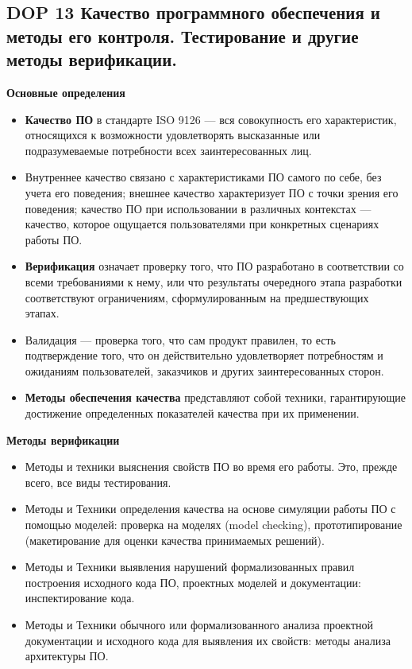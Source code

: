\subsection{DOP 13 Качество программного обеспечения и методы его контроля. Тестирование и другие методы верификации.}

\textbf{Основные определения}
\begin{itemize}
    \item \textbf{Качество ПО} в стандарте ISO 9126 --- вся совокупность его характеристик, относящихся к возможности удовлетворять высказанные или подразумеваемые потребности всех заинтересованных лиц.
    \item Внутреннее качество связано с характеристиками ПО самого по себе, без учета его поведения; внешнее качество характеризует ПО с точки зрения его поведения; качество ПО при использовании в различных контекстах --- качество, которое ощущается пользователями при конкретных сценариях работы ПО.
    \item \textbf{Верификация} означает проверку того, что ПО разработано в соответствии со всеми требованиями к нему, или что результаты очередного этапа разработки соответствуют ограничениям, сформулированным на предшествующих этапах.
    \item Валидация --- проверка того, что сам продукт правилен, то есть подтверждение того, что он действительно удовлетворяет потребностям и ожиданиям пользователей, заказчиков и других заинтересованных сторон.
    \item \textbf{Методы обеспечения качества} представляют собой техники, гарантирующие достижение определенных показателей качества при их применении.
\end{itemize}

\textbf{Методы верификации}

\begin{itemize}
    \item Методы и техники выяснения свойств ПО во время его работы.
    Это, прежде всего, все виды тестирования.
    \item Методы и Техники определения качества на основе симуляции работы ПО с помощью моделей: проверка на моделях (model checking), прототипирование (макетирование для оценки качества принимаемых решений).
    \item Методы и Техники выявления нарушений формализованных правил построения исходного кода ПО, проектных моделей и документации: инспектирование кода.
    \item Методы и Техники обычного или формализованного анализа проектной документации и исходного кода для выявления их свойств: методы анализа архитектуры ПО.
\end{itemize}

